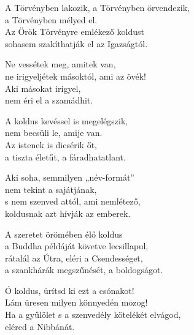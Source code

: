 \begin{dhpverse}

 A Törvényben lakozik, a Törvényben örvendezik,\\
a Törvényben mélyed el.\\
Az Örök Törvényre emlékező koldust\\
sohasem szakíthatják el az Igazságtól.

 Ne vessétek meg, amitek van,\\
ne irigyeljétek másoktól, ami az övék!\\
Aki másokat irigyel,\\
nem éri el a szamádhit.

 A koldus kevéssel is megelégszik,\\
nem becsüli le, amije van.\\
Az istenek is dicsérik őt,\\
a tiszta életűt, a fáradhatatlant.

 Aki soha, semmilyen „név-formát”\\
nem tekint a sajátjának,\\
s nem szenved attól, ami nemlétező,\\
koldusnak azt hívják az emberek.

 A szeretet örömében élő koldus\\
a Buddha példáját követve lecsillapul,\\
rátalál az Útra, eléri a Csendességet,\\
a szankhárák megszűnését, a boldogságot.

 Ó koldus, ürítsd ki ezt a csónakot!\\
Lám üresen milyen könnyedén mozog!\\
Ha a gyűlölet s a szenvedély kötelékét elvágod,\\
eléred a Nibbánát.

\end{dhpverse}
\newpage

